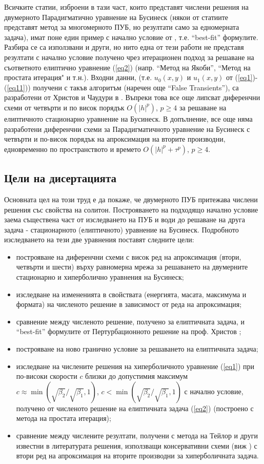 \documentclass[a5paper]{article}
\newcommand{\rf}[1]{(\ref{#1})}
\theoremstyle{remark}
\begin{document}
\begin{normalsize}
Всичките статии, изброени в тази част, които представят числени решения на двумерното Парадигматично уравнение на Бусинеск (някои от статиите представят метод за многомерното ПУБ, но резултати само за едномерната задача), имат поне един пример с начално условие от \cite{ref15}, т.е. ``best-fit'' формулите. Разбира се са използвани и други, но нито една от тези работи не представя резултати с начално условие получено чрез итерационен подход за решаване на съответното елиптично уравнение \rf{eq2} (напр. ``Метод на Якоби'', ``Метод на простата итерация" и т.н.). Входни данни, (т.е. $u_0(x,y)$ и $u_1(x,y)$ от \rf{eq1}-\rf{eq11}) получени с такъв алгоритъм (наречен още ``False Transients''), са разработени от Христов и Чаудури в \cite{ref117,ref116}. Въпреки това все още липсват диференчни схеми от четвърти и по висок порядък $O(|h|^p)$, $p \ge 4$ за решаване на елиптичното стационарно уравнение на Бусинеск. В допълнение, все още няма разработени диференчни схеми за Парадигматичното уравнение на Бусинеск с четвърти и по-висок порядък на апроксимация на вторите производни, едновременно по пространството и времето $O(|h|^p + \tau^p)$, $p \ge 4$.

\subsection{Цели на дисертацията}
Основната цел на този труд е да покаже, че двумерното ПУБ притежава числени решения със свойства на солитон. Построяването на подходящо начално условие заема съществена част от изследването на ПУБ и води до решаване на друга задача - стационарното (елиптичното) уравнение на Бусинеск. Подробното изследването на тези две уравнения поставят следните цели:
\begin{itemize}
  \item построяване на диференчни схеми с висок ред на апроксимация (втори, четвърти и шести) върху равномерна мрежа за решаването на двумерните стационарно и хиперболично уравнения на Бусинеск;
  \item изследване на измененията в свойствата (енергията, масата, максимума и формата) на численото решение в зависимост от реда на апроксимация;
  \item сравнение между численото решение, получено за елиптичната задача, и ``best-fit'' формулите от Пертурбационното решение на проф. Христов \cite{ref15};
  \item построяване на ново гранично условие за решаването на елиптичната задача;
  \item изследване на числените решения на хиперболичното уравнение \rf{eq1} при по-високи скорости $c$ близки до допустимия максимум $c \approx \min (\sqrt{\beta_2}/ \sqrt{\beta_1},1)$, $c < \min (\sqrt{\beta_2}/ \sqrt{\beta_1},1)$ с начално условие, получено от численото решение на елиптичната задача \rf{eq2} (построено с метода на простата итерация);
  \item сравнение между числените резултати, получени с метода на Тейлор и други известни в литературата решения, използващи консервативни схеми (виж \cite{ref20, ref23}) с втори ред на апроксимация на вторите производни за хиперболичната задача.
\end{itemize}


\end{normalsize}
\end{document}
